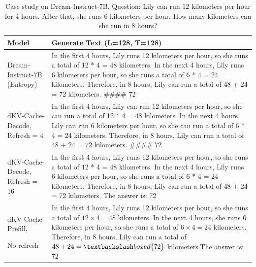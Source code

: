 \documentclass{article}
\newcommand{\dmethodname}{dKV-Cache-Decode}
\newcommand{\pmethodname}{dKV-Cache-Prefill}
\begin{document}
\begin{table}[t!]
    \centering
    \caption{Case study on Dream-Instruct-7B. Question: Lily can run 12 kilometers per hour for 4 hours. After that, she runs 6 kilometers per hour. How many kilometers can she run in 8 hours?} \label{tbl:case_study_Dream}
    \begin{tabular}{p{2cm}|p{11cm}}
    \toprule
    Model & Generate Text (L=128, T=128)\\
    \bottomrule
    Dream-Instruct-7B (Entropy) & In the first 4 hours, Lily runs 12 kilometers per hour, so she runs a total of 12 * 4 = 48 kilometers.
In the next 4 hours, Lily runs 6 kilometers per hour, so she runs a total of 6 * 4 = 24 kilometers.
Therefore, in 8 hours, Lily can run a total of 48 + 24 = 72 kilometers.
\#\#\#\# 72 \\
    \midrule
    \dmethodname, Refresh = 4 & In the first 4 hours, Lily can run 12 kilometers per hour, so she can run a total of 12 * 4 = 48 kilometers.
In the next 4 hours, Lily can run 6 kilometers per hour, so she can run a total of 6 * 4 = 24 kilometers.
Therefore, in 8 hours, Lily can run a total of 48 + 24 = 72 kilometers.
\#\#\#\# 72 \\
    \midrule
    \dmethodname, Refresh = 16 & In the first 4 hours, Lily runs 12 kilometers per hour, so she runs a total of 12 * 4 = 48 kilometers.
In the next 4 hours, Lily runs 6 kilometers per hour, so she runs a total of 6 * 4 = 24 kilometers.
Therefore, in 8 hours, Lily can run a total of 48 + 24 = 72 kilometers.
The answer is: 72 \\
    \midrule
    \pmethodname, 
    
    No refresh & In the first 4 hours, Lily runs 12 kilometers per hour, so she runs a total of $12 \times 4 = 48$ kilometers.
In the next 4 hours, she runs 6 kilometers per hour, so she runs a total of $6 \times 4 = 24$ kilometers.
Therefore, in 8 hours, Lily can run a total of $48 + 24 = \textbackslash boxed\{72\}$ kilometers.The answer is: 72 \\ 
    \bottomrule
    \end{tabular}
\end{table}

\end{document}
